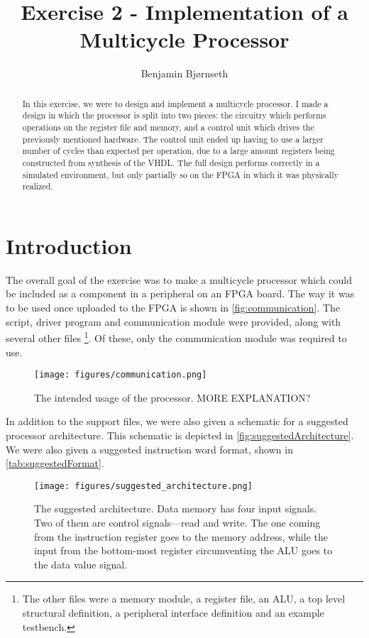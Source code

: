 \documentclass[11pt]{article}
\title{Exercise 2 - Implementation of a Multicycle Processor}
\author{Benjamin Bj\o rnseth}
\begin{document}
\maketitle

\begin{abstract}
  In this exercise, we were to design and implement a multicycle processor. I
  made a design in which the processor is split into two pieces: the circuitry
  which performs operations on the register file and memory, and a control unit
  which drives the previously mentioned hardware. The control unit ended up
  having to use a larger number of cycles than expected per operation, due to a
  large amount registers being constructed from synthesis of the VHDL. The full
  design performs correctly in a simulated environment, but only partially so on
  the FPGA in which it was physically realized.
\end{abstract}

\section{Introduction}
\label{sec:introduction}
The overall goal of the exercise was to make a multicycle processor
which could be included as a component in a peripheral on an FPGA
board. The way it was to be used once uploaded to the FPGA is shown in
\autoref{fig:communication}. The script, driver program and
communication module were provided, along with several other files
\footnote{The other files were a memory module, a register file, an
  ALU, a top level structural definition, a peripheral interface
  definition and an example testbench.}. Of these, only the
communication module was required to use.

\begin{figure}[ht]
  \centering
  \texttt{[image: figures/communication.png]}
  \caption{\label{fig:communication} The intended usage of the
    processor. MORE EXPLANATION?}
\end{figure}

In addition to the support files, we were also given a schematic for a
suggested processor architecture. This schematic is depicted in
\autoref{fig:suggestedArchitecture}. We were also given a suggested
instruction word format, shown in \autoref{tab:suggestedFormat}.
\begin{figure}[ht]
  \centering
  \texttt{[image: figures/suggested\_architecture.png]}
  \caption{\label{fig:suggestedArchitecture} The suggested architecture. Data memory has four input signals. Two of them are control signals---read and write. The one coming from the instruction register goes to the memory address, while the input from the bottom-most register circumventing the ALU goes to the data value signal.}
\end{figure}
\end{document}
